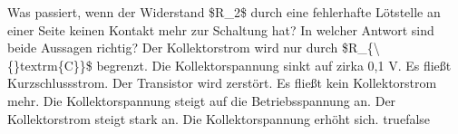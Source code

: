     {Was passiert, wenn der Widerstand \$R\_2\$ durch eine fehlerhafte Lötstelle an einer Seite keinen Kontakt mehr zur Schaltung hat? In welcher Antwort sind beide Aussagen richtig?}
    {Der Kollektorstrom wird nur durch \$R\_\{\textbackslash\{\}textrm\{C\}\}\$ begrenzt. Die Kollektorspannung sinkt auf zirka 0,1 V.}
    {Es fließt Kurzschlussstrom. Der Transistor wird zerstört.}
    {Es fließt kein Kollektorstrom mehr. Die Kollektorspannung steigt auf die Betriebsspannung an.}
    {Der Kollektorstrom steigt stark an. Die Kollektorspannung erhöht sich.}
    {true}{false}